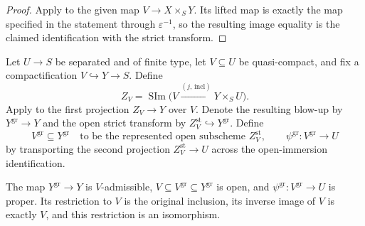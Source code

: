 \begin{proof}
  Apply  to the
  given map $V\to X\times_SY$.  Its lifted map is exactly the map specified in
  the statement through $\varepsilon^{-1}$, so the resulting image equality is
  the claimed identification with the strict transform.
\end{proof}

\begin{definition}
  \label{def:nagata-graph-extension}

  Let $U\to S$ be separated and of finite type, let $V\subseteq U$ be
  quasi-compact, and fix a compactification
  $V\hookrightarrow Y\to S$.  Define
  \[
    Z_V=\operatorname{SIm}
      \bigl(V\xrightarrow{(j,\,\mathrm{incl})}Y\times_SU\bigr).
  \]
  Apply  to the first projection
  $Z_V\to Y$ over $V$.  Denote the resulting blow-up by
  $Y^{\mathrm{gr}}\to Y$ and the open strict transform by
  $Z_V^{\mathrm{st}}\hookrightarrow Y^{\mathrm{gr}}$.  Define
  \[
    V^{\mathrm{gr}}\subseteq Y^{\mathrm{gr}}
      \quad\text{to be the represented open subscheme }Z_V^{\mathrm{st}},
    \qquad
    \psi^{\mathrm{gr}}\colon V^{\mathrm{gr}}\longrightarrow U
  \]
  by transporting the second projection
  $Z_V^{\mathrm{st}}\to U$ across the open-immersion identification.
\end{definition}

\begin{lemma}
  \label{lemma:nagata-graph-extension}

  The map $Y^{\mathrm{gr}}\to Y$ is $V$-admissible,
  $V\subseteq V^{\mathrm{gr}}\subseteq Y^{\mathrm{gr}}$ is open, and
  $\psi^{\mathrm{gr}}\colon V^{\mathrm{gr}}\to U$ is proper.  Its
  restriction to $V$ is the original inclusion, its inverse image of $V$ is
  exactly $V$, and this restriction is an isomorphism.
\end{lemma}

